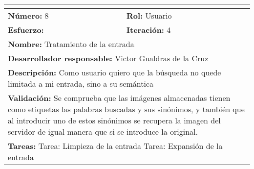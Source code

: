 \begin{tabular}{|p{} |p{} |}
\hline
\multicolumn{2}{|l|}{\cellcolor[HTML]{C0C0C0}{\textbf{Historia de usuario}}} \\ \hline
\textbf{Número:} 8         & \textbf{Rol: } Usuario        \\ \hline
\textbf{Esfuerzo:}           & \textbf{Iteración:}  4        \\ \hline
\multicolumn{2}{|p{0.8\textwidth}|}{\textbf{Nombre:} Tratamiento de la entrada} \\ \hline
\multicolumn{2}{|p{0.8\textwidth}|}{\textbf{Desarrollador responsable:} Victor Gualdras de la Cruz} \\ \hline
\multicolumn{2}{|p{0.8\textwidth}|}{\textbf{Descripción:}\newline
Como usuario quiero que la búsqueda no quede limitada a mi entrada, sino a su semántica} \\ \hline
\multicolumn{2}{|p{0.8\textwidth}|}{\textbf{Validación:}\newline
Se comprueba que las imágenes almacenadas tienen como etiquetas las palabras buscadas y sus sinónimos, y también que al introducir uno de estos sinónimos se recupera la imagen del servidor de igual manera que si se introduce la original.} \\ \hline
\multicolumn{2}{|p{0.8\textwidth}|}{\textbf{Tareas:}\newline
Tarea: Limpieza de la entrada \newline
Tarea: Expansión de la entrada \newline} \\ \hline
\end{tabular}